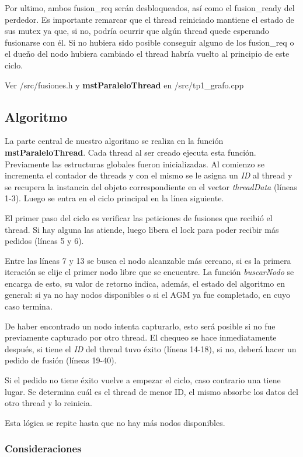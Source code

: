 Por ultimo, ambos fusion\_req serán desbloqueados, así como el fusion\_ready del perdedor. Es importante remarcar que el thread reiniciado mantiene el estado de sus mutex ya que, si no, podría ocurrir que algún thread quede esperando fusionarse con él. Si no hubiera sido posible conseguir alguno de los fusion\_req o el dueño del nodo hubiera cambiado el thread habría vuelto al principio de este ciclo.

Ver \textmd{/src/fusiones.h} y \textbf{mstParaleloThread} en \textmd{/src/tp1_grafo.cpp}

\subsection{Algoritmo}

La parte central de nuestro algoritmo se realiza en la función 
\textbf{mstParaleloThread}. Cada thread al ser creado ejecuta esta función. 
Previamente las estructuras globales fueron inicializadas. Al comienzo se 
incrementa el contador de threads y con el mismo se le asigna un \textit{ID} 
al thread y se recupera la instancia del objeto correspondiente en el vector 
\textit{threadData} (líneas 1-3). Luego se entra en el ciclo principal en la 
línea siguiente.

El primer paso del ciclo es verificar las peticiones de fusiones que recibió el 
thread. Si hay alguna las atiende, luego libera el lock para poder recibir más 
pedidos (líneas 5 y 6).

Entre las líneas 7 y 13 se busca el nodo alcanzable más cercano, si es la 
primera iteración se elije el primer nodo libre que se encuentre. La función 
\textit{buscarNodo} se encarga de esto, su valor de retorno indica, además, 
el estado del algoritmo en general: si ya no hay nodos disponibles o si el AGM 
ya fue completado, en cuyo caso termina.

De haber encontrado un nodo intenta capturarlo, esto será posible si no fue 
previamente capturado por otro thread. El chequeo se hace inmediatamente 
después, si tiene el \textit{ID} del thread tuvo éxito (líneas 14-18), si no, 
deberá hacer un pedido de fusión (líneas 19-40).

Si el pedido no tiene éxito vuelve a empezar el ciclo, caso contrario una 
tiene lugar. Se determina cuál es el thread de menor ID, el mismo absorbe 
los datos del otro thread y lo reinicia.

Esta lógica se repite hasta que no hay más nodos disponibles.

\subsubsection{Consideraciones}

